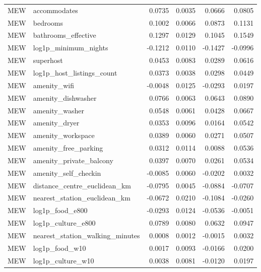\begin{landscape}
\begin{longtable}{>{\raggedright\arraybackslash}p{2cm}>{\raggedright\arraybackslash}p{9cm}rrrr}
MEW & accommodates & 0.0735 & 0.0035 & 0.0666 & 0.0805 \\
MEW & bedrooms & 0.1002 & 0.0066 & 0.0873 & 0.1131 \\
MEW & bathrooms\_\allowbreak{}effective & 0.1297 & 0.0129 & 0.1045 & 0.1549 \\
MEW & log1p\_\allowbreak{}minimum\_\allowbreak{}nights & -0.1212 & 0.0110 & -0.1427 & -0.0996 \\
MEW & superhost & 0.0453 & 0.0083 & 0.0289 & 0.0616 \\
MEW & log1p\_\allowbreak{}host\_\allowbreak{}listings\_\allowbreak{}count & 0.0373 & 0.0038 & 0.0298 & 0.0449 \\
MEW & amenity\_\allowbreak{}wifi & -0.0048 & 0.0125 & -0.0293 & 0.0197 \\
MEW & amenity\_\allowbreak{}dishwasher & 0.0766 & 0.0063 & 0.0643 & 0.0890 \\
MEW & amenity\_\allowbreak{}washer & 0.0548 & 0.0061 & 0.0428 & 0.0667 \\
MEW & amenity\_\allowbreak{}dryer & 0.0353 & 0.0096 & 0.0164 & 0.0542 \\
MEW & amenity\_\allowbreak{}workspace & 0.0389 & 0.0060 & 0.0271 & 0.0507 \\
MEW & amenity\_\allowbreak{}free\_\allowbreak{}parking & 0.0312 & 0.0114 & 0.0088 & 0.0536 \\
MEW & amenity\_\allowbreak{}private\_\allowbreak{}balcony & 0.0397 & 0.0070 & 0.0261 & 0.0534 \\
MEW & amenity\_\allowbreak{}self\_\allowbreak{}checkin & -0.0085 & 0.0060 & -0.0202 & 0.0032 \\
MEW & distance\_\allowbreak{}centre\_\allowbreak{}euclidean\_\allowbreak{}km & -0.0795 & 0.0045 & -0.0884 & -0.0707 \\
MEW & nearest\_\allowbreak{}station\_\allowbreak{}euclidean\_\allowbreak{}km & -0.0672 & 0.0210 & -0.1084 & -0.0260 \\
MEW & log1p\_\allowbreak{}food\_\allowbreak{}e800 & -0.0293 & 0.0124 & -0.0536 & -0.0051 \\
MEW & log1p\_\allowbreak{}culture\_\allowbreak{}e800 & 0.0789 & 0.0080 & 0.0632 & 0.0947 \\
MEW & nearest\_\allowbreak{}station\_\allowbreak{}walking\_\allowbreak{}minutes & 0.0008 & 0.0012 & -0.0015 & 0.0032 \\
MEW & log1p\_\allowbreak{}food\_\allowbreak{}w10 & 0.0017 & 0.0093 & -0.0166 & 0.0200 \\
MEW & log1p\_\allowbreak{}culture\_\allowbreak{}w10 & 0.0038 & 0.0081 & -0.0120 & 0.0197 \\

\end{longtable}
\end{landscape}
